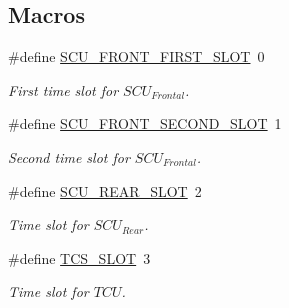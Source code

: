 \subsection*{Macros}
\begin{DoxyCompactItemize}
\item 
\mbox{\label{group___c_a_nopen__timer__module_ga5bb58b675652213c5b20458ab611f9fb}} 
\#define \mbox{\hyperlink{group___c_a_nopen__timer__module_ga5bb58b675652213c5b20458ab611f9fb}{S\+C\+U\+\_\+\+F\+R\+O\+N\+T\+\_\+\+F\+I\+R\+S\+T\+\_\+\+S\+L\+OT}}~0
\begin{DoxyCompactList}\small\item\em First time slot for $SCU_{Frontal}$. \end{DoxyCompactList}\item 
\mbox{\label{group___c_a_nopen__timer__module_gae5482bf356c02f4af400a276980e8bbc}} 
\#define \mbox{\hyperlink{group___c_a_nopen__timer__module_gae5482bf356c02f4af400a276980e8bbc}{S\+C\+U\+\_\+\+F\+R\+O\+N\+T\+\_\+\+S\+E\+C\+O\+N\+D\+\_\+\+S\+L\+OT}}~1
\begin{DoxyCompactList}\small\item\em Second time slot for $SCU_{Frontal}$. \end{DoxyCompactList}\item 
\mbox{\label{group___c_a_nopen__timer__module_gaf913e12f6687d34f5ad716d130416dc8}} 
\#define \mbox{\hyperlink{group___c_a_nopen__timer__module_gaf913e12f6687d34f5ad716d130416dc8}{S\+C\+U\+\_\+\+R\+E\+A\+R\+\_\+\+S\+L\+OT}}~2
\begin{DoxyCompactList}\small\item\em Time slot for $SCU_{Rear}$. \end{DoxyCompactList}\item 
\mbox{\label{group___c_a_nopen__timer__module_ga266f975ed5b87594263f8a2bf8257cdf}} 
\#define \mbox{\hyperlink{group___c_a_nopen__timer__module_ga266f975ed5b87594263f8a2bf8257cdf}{T\+C\+S\+\_\+\+S\+L\+OT}}~3
\begin{DoxyCompactList}\small\item\em Time slot for $TCU$. \end{DoxyCompactList}\item 
\mbox{\label{group___c_a_nopen__timer__module_gaab4fadccdeb20ba1f44ed01296b7e560}} 

\end{DoxyCompactItemize}
